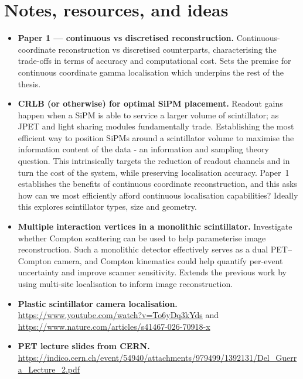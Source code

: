 \documentclass[11pt, a4paper]{article}
\begin{document}
\section*{Notes, resources, and ideas}

\begin{itemize}[leftmargin=1.2em, itemsep=1.0ex, parsep=0pt]
	\item \textbf{Paper 1 --- continuous vs discretised reconstruction.}
		Continuous-coordinate reconstruction vs discretised counterparts, characterising the trade-offs in terms of accuracy and computational cost.
		Sets the premise for continuous coordinate gamma localisation which underpins the rest of the thesis.
	\item \textbf{CRLB (or otherwise) for optimal SiPM placement.}
		Readout gains happen when a SiPM is able to service a larger volume of scintillator; as JPET and light sharing modules fundamentally trade.
		Establishing the most efficient way to position SiPMs around a scintillator volume to maximise the information content of the data - an information and sampling theory question.
		This intrinsically targets the reduction of readout channels and in turn the cost of the system, while preserving localisation accuracy.
		Paper~1 establishes the benefits of continuous coordinate reconstruction, and this asks how can we most efficiently afford continuous localisation capabilities?
		Ideally this explores scintillator types, size and geometry.
	\item \textbf{Multiple interaction vertices in a monolithic scintillator.}
		Investigate whether Compton scattering can be used to help parameterise image reconstruction.
		Such a monolithic detector effectively serves as a dual PET--Compton camera, and Compton kinematics could help quantify per-event uncertainty and improve scanner sensitivity.
		Extends the previous work by using multi-site localisation to inform image reconstruction.
	\item \textbf{Plastic scintillator camera localisation.}
		\url{https://www.youtube.com/watch?v=To6yDq3kYds} and \url{https://www.nature.com/articles/s41467-026-70918-x}
	\item \textbf{PET lecture slides from CERN.}
		\url{https://indico.cern.ch/event/54940/attachments/979499/1392131/Del_Guerra_Lecture_2.pdf}
\end{itemize}
\end{document}

